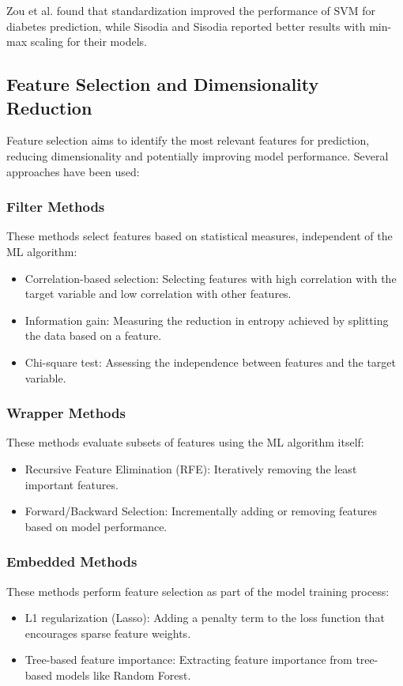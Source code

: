 \documentclass[journal]{IEEEtran}
\begin{document}
Zou et al. \cite{zou2018} found that standardization improved the performance of SVM for diabetes prediction, while Sisodia and Sisodia \cite{sisodia2018} reported better results with min-max scaling for their models.

\subsection{Feature Selection and Dimensionality Reduction}
Feature selection aims to identify the most relevant features for prediction, reducing dimensionality and potentially improving model performance. Several approaches have been used:

\subsubsection{Filter Methods}
These methods select features based on statistical measures, independent of the ML algorithm:
\begin{itemize}
    \item Correlation-based selection: Selecting features with high correlation with the target variable and low correlation with other features.
    \item Information gain: Measuring the reduction in entropy achieved by splitting the data based on a feature.
    \item Chi-square test: Assessing the independence between features and the target variable.
\end{itemize}

\subsubsection{Wrapper Methods}
These methods evaluate subsets of features using the ML algorithm itself:
\begin{itemize}
    \item Recursive Feature Elimination (RFE): Iteratively removing the least important features.
    \item Forward/Backward Selection: Incrementally adding or removing features based on model performance.
\end{itemize}

\subsubsection{Embedded Methods}
These methods perform feature selection as part of the model training process:
\begin{itemize}
    \item L1 regularization (Lasso): Adding a penalty term to the loss function that encourages sparse feature weights.
    \item Tree-based feature importance: Extracting feature importance from tree-based models like Random Forest.
\end{itemize}
\end{document}
